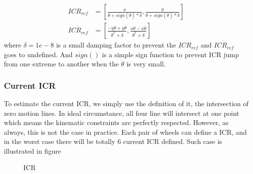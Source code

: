 \begin{equation}\label{eq:ICR_refModified}
    \begin{split}
		 ICR_{ref}&=[\frac{\dot{x}}{\dot{\theta}+sign(\dot{\theta})*\delta} ,\frac{\dot{y}}{\dot{\theta}+sign(\dot{\theta})*\delta}] \\
		 \dot{ICR_{ref}}&=[\frac{-\ddot{y}\dot{\theta}+\dot{y}\ddot{\theta}}{\dot{\theta}^2+\delta},\frac{\ddot{x}\dot{\theta}-\dot{x}\ddot{\theta}}{\dot{\theta}^2+\delta}]
    \end{split}
\end{equation}
where $\delta=1e-8$ is a small damping factor to prevent the $ICR_{ref}$ and $\dot{ICR_{ref}}$ goes to undefined. And $sign()$ is a simple sign function to prevent ICR jump from one extreme to another when the $\dot{\theta}$ is very small.

\subsubsection{Current ICR}
To estimate the current ICR, we simply use the definition of it, the intersection of zero motion lines. In ideal circumstance, all four line will intersect at one point which means the kinematic constraints are 
perfectly respected. However, as always, this is not the case in practice. Each pair of wheels can define a ICR, and in the worst case there will be totally 6 current ICR defined. Such case is illustrated in figure 

\begin{figure}[t]
	\begin{center}
	\resizebox{10cm}{!}
    {
		}
	\end{center}
	\caption{ICR}
\end{figure}



